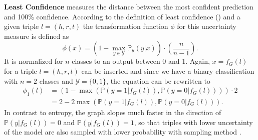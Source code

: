 \textbf{Least Confidence} 
measures the distance between the most confident prediction and 100\% confidence.
According to the definition of least confidence () and a given triple $l = (h,r,t)$ the transformation function $\phi$ for this uncertainty measure is defined as
\begin{equation}
    \phi(x) = (1 - \max_{y \in \mathcal{Y}}{\mathds{P}_{\theta}(y | x)}) \cdot \left(\frac{n}{n-1}\right).
\end{equation}
It is normalized for $n$ classes to an output between 0 and 1.
Again, $x = f_G(l)$ for a triple $l = (h,r,t)$ can be inserted and since we have a binary classification with $n = 2$ classes and $\mathcal{Y} = \{0,1\}$, the equation can be rewritten to
\begin{equation} \label{eq:leastconfidence}
\begin{split}
\phi_1(l) 
& = (1 - \max({\mathds{P}(y = 1| f_G(l)), \mathds{P}(y = 0| f_G(l))})) \cdot 2 \\
&= 2 - 2 \max({\mathds{P}(y = 1| f_G(l)), \mathds{P}(y = 0| f_G(l))}).
\end{split}
\end{equation}
In contrast to entropy, the graph slopes much faster in the direction of $\mathds{P}(y | f_G(l)) = 0$ and $\mathds{P}(y | f_G(l)) = 1$, so that triples with lower uncertainty of the model are also sampled with lower probability with sampling method \ussoftmax.

